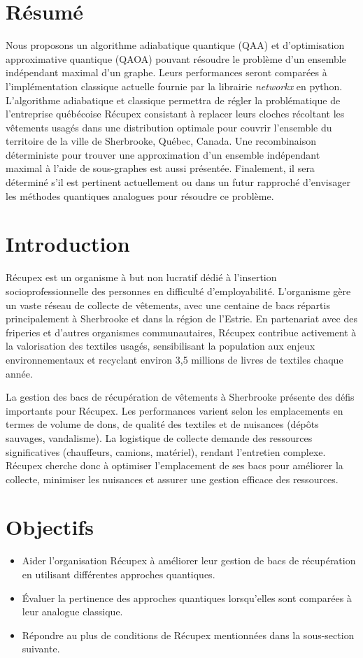 \documentclass[11pt]{article}
\begin{document}

\setcounter{figure}{0}
\tableofcontents
\newpage
\section*{Résumé}
Nous proposons un algorithme adiabatique quantique (QAA) et d'optimisation approximative quantique (QAOA) pouvant résoudre le problème d'un ensemble indépendant maximal d'un graphe. Leurs performances seront comparées à l'implémentation classique actuelle fournie par la librairie \textit{networkx} en python. L'algorithme adiabatique et classique permettra de régler la problématique de l'entreprise québécoise Récupex consistant à replacer leurs cloches récoltant les vêtements usagés dans une distribution optimale pour couvrir l'ensemble du territoire de la ville de Sherbrooke, Québec, Canada. Une recombinaison déterministe pour trouver une approximation d'un ensemble indépendant maximal à l'aide de sous-graphes est aussi présentée. Finalement, il sera déterminé s'il est pertinent actuellement ou dans un futur rapproché d'envisager les méthodes quantiques analogues pour résoudre ce problème.

\section{Introduction}
Récupex est un organisme à but non lucratif dédié à l’insertion socioprofessionnelle des personnes en difficulté d’employabilité. L’organisme gère un vaste réseau de collecte de vêtements, avec une centaine de bacs répartis principalement à Sherbrooke et dans la région de l’Estrie. En partenariat avec des friperies et d’autres organismes communautaires, Récupex contribue activement à la valorisation des textiles usagés, sensibilisant la population aux enjeux environnementaux et recyclant environ 3,5 millions de livres de textiles chaque année.

La gestion des bacs de récupération de vêtements à Sherbrooke présente des défis importants pour Récupex. Les performances varient selon les emplacements en termes de volume de dons, de qualité des textiles et de nuisances (dépôts sauvages, vandalisme). La logistique de collecte demande des ressources significatives (chauffeurs, camions, matériel), rendant l'entretien complexe. Récupex cherche donc à optimiser l'emplacement de ses bacs pour améliorer la collecte, minimiser les nuisances et assurer une gestion efficace des ressources.

\section{Objectifs}
\begin{itemize}
    \item Aider l'organisation Récupex à améliorer leur gestion de bacs de récupération en utilisant différentes approches quantiques.
\item Évaluer la pertinence des approches quantiques lorsqu’elles sont comparées à leur analogue classique.
\item Répondre au plus de conditions de Récupex mentionnées dans la sous-section suivante.
\end{itemize}
\end{document}
